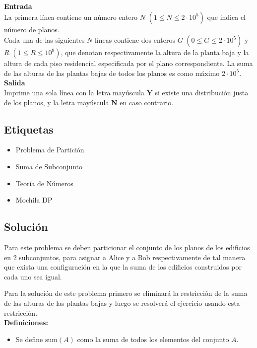 \documentclass{article}
\begin{document}
\textbf{Entrada}\\

La primera línea contiene un número entero $N$ $(1\leq N\leq 2\cdot 10^5)$ que indica el número de planos.\\

Cada una de las siguientes $N$ líneas contiene dos enteros $G$ $(0\leq G\leq 2\cdot 10^5)$ y $R$ $(1\leq R\leq 10^9)$, que denotan respectivamente la altura de la planta baja y la altura de cada piso residencial especificada por el plano correspondiente. La suma de las alturas de las plantas bajas de todos los planos es como máximo $2\cdot 10^5$.\\

\textbf{Salida}\\

Imprime una sola línea con la letra mayúscula \textbf{Y} si existe una distribución justa de los planos, y la letra mayúscula \textbf{N} en caso contrario.

\subsection{Etiquetas}

\begin{itemize}
    \item Problema de Partición
    \item Suma de Subconjunto
    \item Teoría de Números
    \item Mochila DP
\end{itemize}

\subsection{Solución}

Para este problema se deben particionar el conjunto de los planos de los edificios en 2 subconjuntos, para asignar a Alice y a Bob
respectivamente de tal manera que exista una configuración en la que la suma de los edificios construidos por cada uno sea igual.

Para la solución de este problema primero se eliminará la restricción de la suma de las alturas de las plantas bajas y luego
se resolverá el ejercicio usando esta restricción.\\

\textbf{Definiciones:}

\begin{itemize}
    \item Se define $\text{sum}(A)$ como la suma de todos los elementos del conjunto $A$.
\end{itemize}
\end{document}
